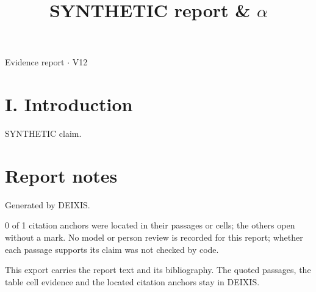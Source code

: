\documentclass[journal]{IEEEtran}
\begin{document}
\title{SYNTHETIC report \& \ensuremath{\alpha}}

\maketitle

\noindent Evidence report \ensuremath{\cdot} V12

\section*{I. Introduction}

SYNTHETIC claim. \cite{Synth26}

\section*{Report notes}

Generated by DEIXIS.

0 of 1 citation anchors were located in their passages or cells; the others open without a mark. No model or person review is recorded for this report; whether each passage supports its claim was not checked by code.

This export carries the report text and its bibliography. The quoted passages, the table cell evidence and the located citation anchors stay in DEIXIS.




\end{document}

